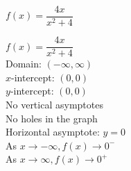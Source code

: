 {$f(x) = \dfrac{4x}{x^2+4}$}
{$f(x) = \dfrac{4x}{x^{2} + 4}$\\
Domain: $(-\infty,  \infty)$\\
$x$-intercept:  $(0,0)$\\
$y$-intercept:  $(0,0)$\\
No vertical asymptotes \\
No holes in the graph\\
Horizontal asymptote: $y = 0$ \\
As $x \rightarrow -\infty, f(x) \rightarrow 0^{-}$\\
As $x \rightarrow \infty, f(x) \rightarrow 0^{+}$


\begin{center}
\end{center}}
